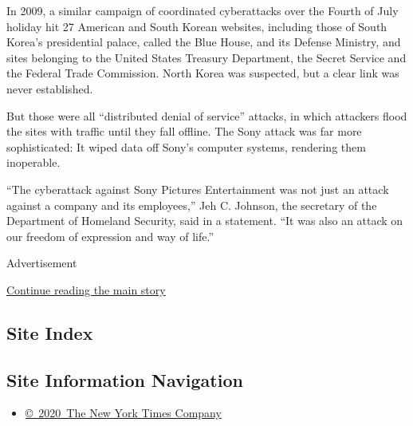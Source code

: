 In 2009, a similar campaign of coordinated cyberattacks over the Fourth
of July holiday hit 27 American and South Korean websites, including
those of South Korea's presidential palace, called the Blue House, and
its Defense Ministry, and sites belonging to the United States Treasury
Department, the Secret Service and the Federal Trade Commission. North
Korea was suspected, but a clear link was never established.

But those were all ``distributed denial of service'' attacks, in which
attackers flood the sites with traffic until they fall offline. The Sony
attack was far more sophisticated: It wiped data off Sony's computer
systems, rendering them inoperable.

``The cyberattack against Sony Pictures Entertainment was not just an
attack against a company and its employees,'' Jeh C. Johnson, the
secretary of the Department of Homeland Security, said in a statement.
``It was also an attack on our freedom of expression and way of life.''

Advertisement

\protect\hyperlink{after-bottom}{Continue reading the main story}

\hypertarget{site-index}{%
\subsection{Site Index}\label{site-index}}

\hypertarget{site-information-navigation}{%
\subsection{Site Information
Navigation}\label{site-information-navigation}}

\begin{itemize}
\tightlist
\item
  \href{https://help.nytimes3xbfgragh.onion/hc/en-us/articles/115014792127-Copyright-notice}{©~2020~The
  New York Times Company}
\end{itemize}

